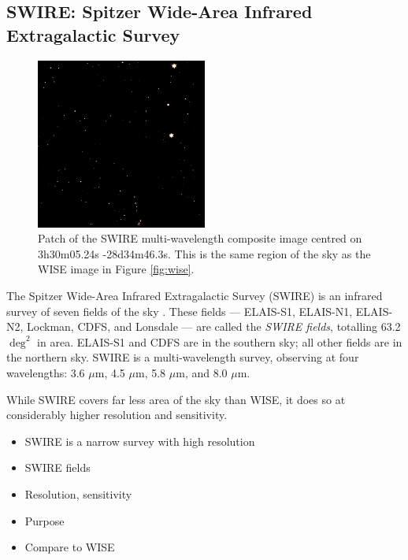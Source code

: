         \subsection{SWIRE: Spitzer Wide-Area Infrared Extragalactic Survey}
        \label{sec:swire}

            \begin{figure}[!ht]
                \centering
                \includegraphics[width=0.5\textwidth]{images/swire_small.jpg}
                \caption{Patch of the SWIRE multi-wavelength composite image
                    centred on 3h30m05.24s -28d34m46.3s. This is the same region
                    of the sky as the WISE image in Figure \ref{fig:wise}.}
            \end{figure}

            The Spitzer Wide-Area Infrared Extragalactic Survey (SWIRE) is an
            infrared survey of seven fields of the sky
            \citep{lonsdale03}. These fields --- ELAIS-S1, ELAIS-N1, ELAIS-N2,
            Lockman, CDFS, and Lonsdale --- are called the \emph{SWIRE fields},
            totalling 63.2 $\deg^2$ in area. ELAIS-S1 and CDFS are in the
            southern sky; all other fields are in the northern sky. SWIRE is a multi-wavelength survey, observing at four wavelengths: 3.6 $\mu$m, 4.5 $\mu$m, 5.8 $\mu$m, and 8.0 $\mu$m.

            While SWIRE covers far less area of the sky than WISE, it does so at considerably higher resolution and sensitivity.

            \begin{itemize}
                \item SWIRE is a narrow survey with high resolution
                \item SWIRE fields
                \item Resolution, sensitivity
                \item Purpose
                \item Compare to WISE
            \end{itemize}

